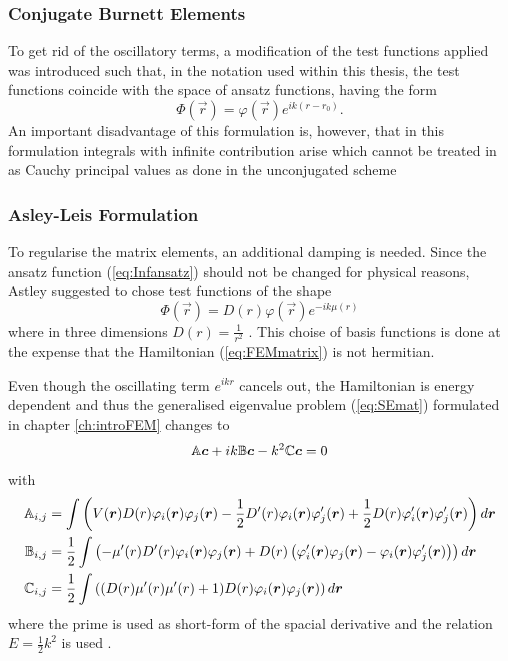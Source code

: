 \subsubsection{Conjugate Burnett Elements}
To get rid of the oscillatory terms, a modification of the test functions applied was introduced such that, in the notation used within this thesis, the test functions coincide with the space of ansatz functions, having the form
\begin{equation}
 \Phi(\vec{r}) = \varphi(\vec{r}) e^{ik(r-r_0)}.
\end{equation}
An important disadvantage of this formulation is, however, that in this formulation integrals with infinite contribution arise which cannot be treated in as Cauchy principal values as done in the unconjugated scheme \cite{infelNew}

\subsubsection{Asley-Leis Formulation}
To regularise the matrix elements, an additional damping is needed.
Since the ansatz function (\ref{eq:Infansatz}) should not be changed for physical reasons, Astley suggested to chose test functions of the shape
\begin{equation} \label{eq:ALelem}
 \Phi(\vec{r}) = D(r)\varphi(\vec{r}) e^{-ik\mu(r)}
\end{equation}
where in three dimensions $D(r)=\frac{1}{r^2}$ \cite{astley2}.
This choise of basis functions is done at the expense that the Hamiltonian (\ref{eq:FEMmatrix}) is not hermitian.

Even though the oscillating term $e^{ikr}$ cancels out, the Hamiltonian is energy dependent and thus the generalised eigenvalue problem (\ref{eq:SEmat}) formulated in chapter \ref{ch:introFEM} changes to
\begin{equation} \label{eq:SEinf}
\mathbb{A}\bm{c} +ik \mathbb{B}\bm{c}- k^2 \mathbb{C}\bm{c} =0 
\end{equation}
with
\begin{align} \label{eq:InFEMmatrix}
\mathbb{A}_{i,j}& =\int \left(V(\bm{r}) D(r) \varphi_i(\bm{r}) \varphi_j(\bm{r}) 
                 -\frac 12 D'(r) \varphi_i(\bm{r})\varphi'_j(\bm{r})
                 +\frac 12 D(r) \varphi'_i(\bm{r})\varphi'_j(\bm{r}) \right) d\bm{r}\\
\mathbb{B}_{i,j}&=\frac 12 \int\left( -\mu'(r)D'(r) \varphi_i(\bm{r})\varphi_j(\bm{r})
                + D(r) \left(\varphi'_i(\bm{r})\varphi_j(\bm{r}) -\varphi_i(\bm{r})\varphi'_j(\bm{r})\right) \right) d\bm{r} \\
\mathbb{C}_{i,j}&= \frac 12 \int\left( (D(r) \mu'(r) \mu'(r) + 1) D(r) \varphi_i(\bm{r}) \varphi_j(\bm{r})\right) d\bm{r}
\end{align}
where the prime is used as short-form of the spacial derivative and the relation $E=\frac 12 k^2$ is used \cite{dreyer}.


